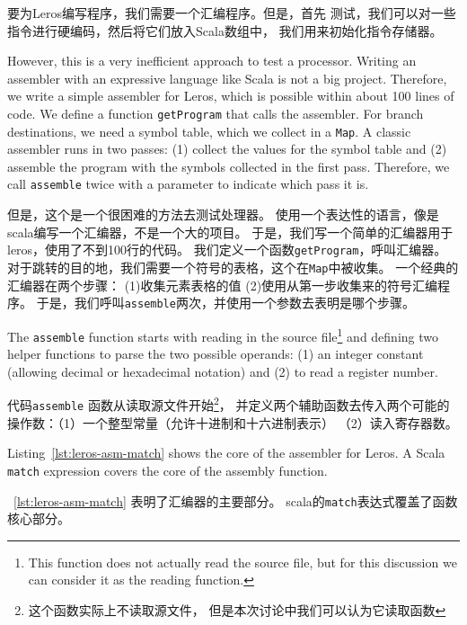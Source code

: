\documentclass[%
    10pt,
    headinclude, footexclude,
    openright, %
    notitlepage,
    cleardoubleempty,
    headsepline,
    pointlessnumbers,
    bibtotoc, idxtotoc,
    ]{scrbook}
\newcommand{\code}[1]{{\small{\texttt{#1}}}}
\newcommand{\todo}[1]{{\emph{TODO: #1}}}
\renewcommand{\todo}[1]{}
\begin{document}
要为Leros编写程序，我们需要一个汇编程序。但是，首先
测试，我们可以对一些指令进行硬编码，然后将它们放入Scala数组中，
我们用来初始化指令存储器。


\noindent However, this is a very inefficient approach to test a processor.
Writing an assembler with an expressive language like Scala is not a big project.
Therefore, we write a simple assembler for Leros, which is possible within about
100 lines of code. We define a function \code{getProgram} that calls the assembler.
For branch destinations, we need a symbol table, which we collect in a \code{Map}.
A classic assembler runs in two passes: (1) collect the values for the symbol table
and (2) assemble the program with the symbols collected in the first pass.
Therefore, we call \code{assemble} twice with a parameter to indicate which pass it is.

\noindent 但是，这个是一个很困难的方法去测试处理器。
使用一个表达性的语言，像是scala编写一个汇编器，不是一个大的项目。
于是，我们写一个简单的汇编器用于leros，使用了不到100行的代码。
我们定义一个函数\code{getProgram}，呼叫汇编器。
对于跳转的目的地，我们需要一个符号的表格，这个在\code{Map}中被收集。
一个经典的汇编器在两个步骤：
(1)收集元素表格的值
(2)使用从第一步收集来的符号汇编程序。
于是，我们呼叫\code{assemble}两次，并使用一个参数去表明是哪个步骤。


The \code{assemble} function starts with reading in the source
file\footnote{This function does not actually read the source file, but for this
discussion we can consider it as the reading function.}
and defining two helper functions to parse the two possible operands: (1) an
integer constant (allowing decimal or hexadecimal notation) and (2) to read
a register number.

代码\code{assemble} 函数从读取源文件开始\footnote{这个函数实际上不读取源文件，
但是本次讨论中我们可以认为它读取函数}，
并定义两个辅助函数去传入两个可能的操作数：（1）一个整型常量（允许十进制和十六进制表示）
（2）读入寄存器数。


Listing~\ref{lst:leros-asm-match} shows the core of the assembler for Leros.
A Scala \code{match} expression covers the core of the assembly function.
\todo{Some more words on the code.}

~\ref{lst:leros-asm-match} 表明了汇编器的主要部分。
scala的\code{match}表达式覆盖了函数核心部分。
\end{document}
